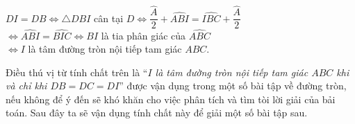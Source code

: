 \begin{bt}
{{$DI=DB \Leftrightarrow \triangle DBI$ cân tại $D \Leftrightarrow \dfrac{\widehat{A}}{2}+\widehat{ABI}=\widehat{IBC}+\dfrac{\widehat{A}}{2}$\\
$\Leftrightarrow \widehat{ABI}=\widehat{BIC}\Leftrightarrow BI$ là tia phân giác của $\widehat{ABC}$\\
$\Leftrightarrow I$ là tâm đường tròn nội tiếp tam giác $ABC$.		   
}{
}
\begin{nx}
Điều thú vị từ tính chất trên là ``{\it $I$ là tâm đường tròn nội tiếp tam giác $ABC$ khi và chỉ khi $DB=DC=DI$}'' được vận dụng trong một số bài tập về đường tròn, nếu không để ý đến sẽ khó khăn cho việc phân tích và tìm tòi lời giải của bải toán. Sau đây ta sẽ vận dụng tính chất này để giải một số bài tập sau.
\end{nx}
}
\end{bt}

